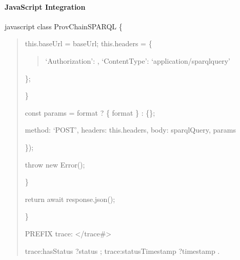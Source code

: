 \documentclass[letterpaper,10pt,english]{sphinxmanual}
\begin{document}
\paragraph{JavaScript Integration}
\label{\detokenize{api/sparql-api:javascript-integration}}
\sphinxAtStartPar
{\color{red}\bfseries{}\textasciigrave{}\textasciigrave{}}{\color{red}\bfseries{}\textasciigrave{}}javascript
class ProvChainSPARQL \{
\begin{quote}
\begin{description}
\sphinxAtStartPar
this.baseUrl = baseUrl;
this.headers = \{
\begin{quote}

\sphinxAtStartPar
‘Authorization’: ,
‘Content\sphinxhyphen{}Type’: ‘application/sparql\sphinxhyphen{}query’
\end{quote}

\sphinxAtStartPar
\};

\end{description}

\sphinxAtStartPar
\}
\begin{description}
\sphinxAtStartPar
const params = format ? \{ format \} : \{\};
\begin{description}
\sphinxAtStartPar
method: ‘POST’,
headers: this.headers,
body: sparqlQuery,
params

\end{description}

\sphinxAtStartPar
\});
\begin{description}
\sphinxAtStartPar
throw new Error();

\end{description}

\sphinxAtStartPar
\}

\sphinxAtStartPar
return await response.json();

\end{description}

\sphinxAtStartPar
\}
\begin{description}
\begin{description}
\sphinxAtStartPar
PREFIX trace: \textless{}/trace\#\textgreater{}
\begin{description}
\begin{description}
\sphinxAtStartPar
trace:hasStatus ?status ;
trace:statusTimestamp ?timestamp .


\end{description}
\end{description}
\end{description}
\end{description}
\end{quote}
\end{document}
